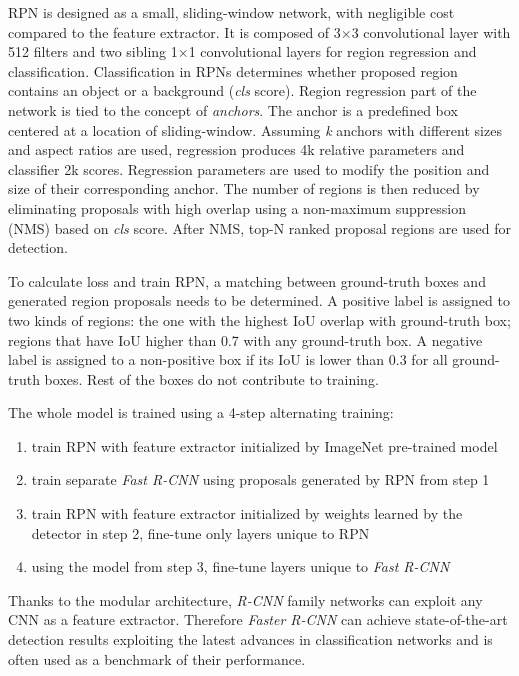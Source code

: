  RPN is designed as a small, sliding-window network, with negligible cost compared to the feature extractor. It is composed of 3$\times$3 convolutional layer with 512 filters and two sibling 1$\times$1 convolutional layers for region regression and classification. Classification in RPNs determines whether proposed region contains an object or a background (\textit{cls} score). Region regression part of the network is tied to the concept of \textit{anchors}. The anchor is a predefined box centered at a location of sliding-window. Assuming \textit{k} anchors with different sizes and aspect ratios are used, regression produces 4k relative parameters and classifier 2k scores. Regression parameters are used to modify the position and size of their corresponding anchor. The number of regions is then reduced by eliminating proposals with high overlap using a non-maximum suppression (NMS) based on \textit{cls} score. After NMS, top-N ranked proposal regions are used for detection.
 
 To calculate loss and train RPN, a matching between ground-truth boxes and generated region proposals needs to be determined. A positive label is assigned to two kinds of regions: the one with the highest IoU overlap with ground-truth box; regions that have IoU higher than 0.7 with any ground-truth box. A negative label is assigned to a non-positive box if its IoU is lower than 0.3 for all ground-truth boxes. Rest of the boxes do not contribute to training. 
 
 The whole model is trained using a 4-step alternating training:
 
 \begin{enumerate}
     \item train RPN with feature extractor initialized by ImageNet pre-trained model
     \item train separate \textit{Fast R-CNN} using proposals generated by RPN from step 1
     \item train RPN with feature extractor initialized by weights learned by the detector in step 2, fine-tune only layers unique to RPN
     \item using the model from step 3, fine-tune layers unique to \textit{Fast R-CNN}
 \end{enumerate}

Thanks to the modular architecture, \textit{R-CNN} family networks can exploit any CNN as a feature extractor.  Therefore \textit{Faster R-CNN} can achieve state-of-the-art detection results exploiting the latest advances in classification networks and is often used as a benchmark of their performance.
     

